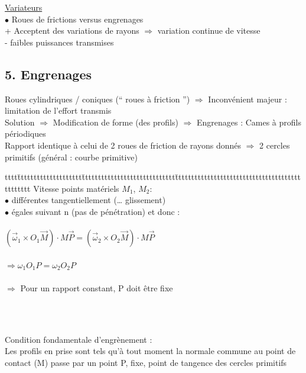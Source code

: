 \underline{Variateurs}\\
$\bullet$ Roues de frictions versus engrenages\\
{\color{green}+ Acceptent des variations de rayons $\Rightarrow$ variation continue de vitesse}\\
{\color{red}- faibles puissances transmises}\\

\subsection*{5. Engrenages}
Roues cylindriques / coniques (“ roues à friction ”) $\Rightarrow$ Inconvénient majeur : limitation de l’effort transmis\\
{\color{green}Solution} $\Rightarrow$ Modification de forme (des profils) $\Rightarrow$ {\color{orange}Engrenages} : Cames à profils périodiques\\

Rapport identique à celui de 2 roues de friction de rayons donnés $\Rightarrow$ 2 cercles primitifs (général : courbe primitive)\\

\begin{bluebox}
\begin{tabbing}
tttt\=tttttttttttttttttttt\=ttttttttttttttttttttttttttttt\=ttttttttttttttttttttttttttttttttttttttttttttttt\kill
Vitesse points matériels $M_1$, $M_2$:\\
\>$\bullet$ différentes tangentiellement (… glissement)\\
\>$\bullet$ égales suivant n (pas de pénétration) et donc :\\\\
\>$(\vec{\omega}_1\times O_1\vec{M})\cdot M\vec{P} = (\vec{\omega}_2\times O_2\vec{M})\cdot M\vec{P}$\\\\
\> $\Rightarrow \omega_1O_1P=\omega_2O_2P$\\\\
$\Rightarrow$ Pour un rapport {\color{orange}constant}, P doit être fixe
\end{tabbing}
\end{bluebox}\\\\

\begin{orangebox}
{\color{orange}Condition fondamentale d’engrènement} :\\
Les profils en prise sont tels qu’à tout moment la normale commune au point de contact (M) passe par un point P, fixe, point de tangence des cercles primitifs
\end{orangebox}\\\\

